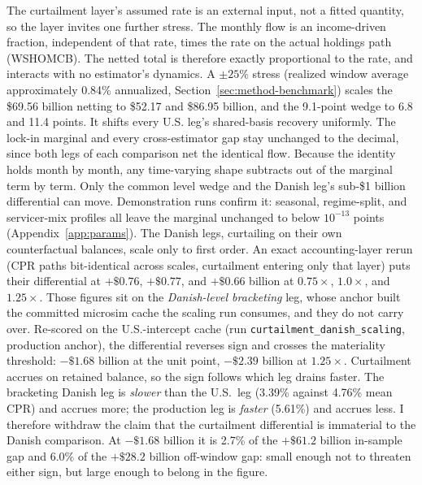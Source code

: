 \documentclass[12pt]{article}
\begin{document}
The curtailment layer's assumed rate is an external input, not a fitted quantity, so the layer invites one further stress. The monthly flow is an income-driven fraction, independent of that rate, times the rate on the actual holdings path (WSHOMCB). The netted total is therefore exactly proportional to the rate, and interacts with no estimator's dynamics. A $\pm 25\%$ stress (realized window average approximately 0.84\% annualized, Section~\ref{sec:method-benchmark}) scales the \$69.56 billion netting to \$52.17 and \$86.95 billion, and the 9.1-point wedge to 6.8 and 11.4 points. It shifts every U.S. leg's shared-basis recovery uniformly. The lock-in marginal and every cross-estimator gap stay unchanged to the decimal, since both legs of each comparison net the identical flow. Because the identity holds month by month, any time-varying shape subtracts out of the marginal term by term. Only the common level wedge and the Danish leg's sub-\$1 billion differential can move. Demonstration runs confirm it: seasonal, regime-split, and servicer-mix profiles all leave the marginal unchanged to below $10^{-13}$ points (Appendix~\ref{app:params}). The Danish legs, curtailing on their own counterfactual balances, scale only to first order. An exact accounting-layer rerun (CPR paths bit-identical across scales, curtailment entering only that layer) puts their differential at $+\$0.76$, $+\$0.77$, and $+\$0.66$ billion at $0.75\times$, $1.0\times$, and $1.25\times$. Those figures sit on the \emph{Danish-level bracketing} leg, whose anchor built the committed microsim cache the scaling run consumes, and they do not carry over. Re-scored on the U.S.-intercept cache (run \texttt{curtailment\_danish\_scaling}, production anchor), the differential reverses sign and crosses the materiality threshold: $-\$1.68$ billion at the unit point, $-\$2.39$ billion at $1.25\times$. Curtailment accrues on retained balance, so the sign follows which leg drains faster. The bracketing Danish leg is \emph{slower} than the U.S.\ leg (3.39\% against 4.76\% mean CPR) and accrues more; the production leg is \emph{faster} (5.61\%) and accrues less. I therefore withdraw the claim that the curtailment differential is immaterial to the Danish comparison. At $-\$1.68$ billion it is 2.7\% of the $+\$61.2$ billion in-sample gap and 6.0\% of the $+\$28.2$ billion off-window gap: small enough not to threaten either sign, but large enough to belong in the figure.
\end{document}
